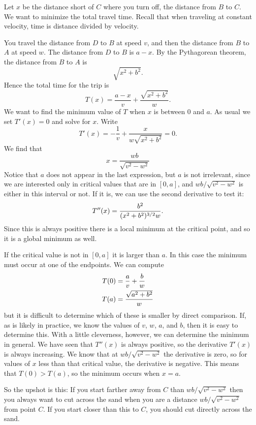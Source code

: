 \begin{example}
    \begin{solution}
    Let $x$ be the distance short of $C$ where you turn off, the distance
    from $B$ to $C$.  We want to minimize the total travel time.  Recall
    that when traveling at constant velocity, time is distance divided by
    velocity.
    
    You travel the distance from $D$ to $B$ at speed $v$, and then the
    distance from $B$ to $A$ at speed $w$.  The distance from $D$ to $B$
    is $a-x$. By the Pythagorean theorem, the distance from $B$ to $A$
    is
    \[
    \sqrt{x^2+b^2}.
    \] 
    Hence the total time for the trip is
    \[
       T(x)=\frac{a-x}{v}+\frac{\sqrt{x^2+b^2}}{w}.
    \]
    We want to find the minimum value of $T$ when $x$ is between 0 and
    $a$.  As usual we set $T'(x)=0$ and solve for $x$. Write
    \[
      T'(x)=-\frac{1}{v}+\frac{x}{w\sqrt{x^2+b^2}} =0.
    \]
    We find that 
    \[
    x=\frac{wb}{\sqrt{v^2-w^2}}
    \]
    Notice that $a$ does not appear in the last expression, but $a$ is not
    irrelevant, since we are interested only in critical values that are
    in $[0,a]$, and $wb/\sqrt{v^2-w^2}$ is either in this interval or not.
    If it is, we can use the second derivative to test it:
    \[
    T''(x) = {b^2\over (x^2+b^2)^{3/2}w}.
    \]
    Since this is always positive there is a local minimum at the critical
    point, and so it is a global minimum as well.
    
    If the critical value is not in $[0,a]$ it is larger than $a$. In this
    case the minimum must occur at one of the endpoints. We can compute
    \begin{align*}
    T(0)&={a\over v}+{b\over w} \\
    T(a)&={\sqrt{a^2+b^2}\over w} 
    \end{align*}
    but it is difficult to determine which of these is smaller by direct
    comparison. If, as is likely in practice, we know the values of $v$,
    $w$, $a$, and $b$, then it is easy to determine this. With a little
    cleverness, however, we can determine the minimum in general. We have seen that
    $T''(x)$ is always positive, so the derivative $T'(x)$ is always increasing.
    We know that at $wb/\sqrt{v^2-w^2}$ the derivative is zero, so for
    values of $x$ less than that critical value, the derivative is
    negative. This means that $T(0)>T(a)$, so the minimum occurs when $x=a$.
    
    So the upshot is this: If you start farther away from $C$ than
    $wb/\sqrt{v^2-w^2}$ then you always want to cut across the sand 
    when you are a distance $wb/\sqrt{v^2-w^2}$ from point $C$. If you
    start closer than this to $C$, you should cut directly across the sand.
    \end{solution}
\end{example}
    

